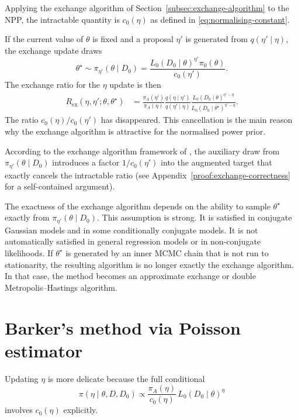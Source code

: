 Applying the exchange algorithm of Section~\ref{subsec:exchange-algorithm} to the NPP, the intractable quantity is $c_0(\eta)$ as defined in \eqref{eq:normalising-constant}.

If the current value of $\theta$ is fixed and a proposal $\eta'$ is generated from $q(\eta' \mid \eta)$, the exchange update draws
\begin{equation}
\theta^\star
\sim
\pi_{\eta'}(\theta \mid D_0)
=
\frac{L_0(D_0 \mid \theta)^{\eta'}\pi_0(\theta)}
{c_0(\eta')}.
\end{equation}
The exchange ratio for the $\eta$ update is then
\begin{align}
R_{\mathrm{ex}}(\eta,\eta';\theta,\theta^\star)
&=
\frac{\pi_A(\eta')}{\pi_A(\eta)}
\frac{q(\eta \mid \eta')}{q(\eta' \mid \eta)}
\frac{L_0(D_0 \mid \theta)^{\eta'-\eta}}
{L_0(D_0 \mid \theta^\star)^{\eta'-\eta}}.
\end{align}
The ratio $c_0(\eta)/c_0(\eta')$ has disappeared.
This cancellation is the main reason why the exchange algorithm is attractive for the normalised power prior.

According to the exchange algorithm framework of , the auxiliary draw from $\pi_{\eta'}(\theta \mid D_0)$ introduces a factor $1/c_0(\eta')$ into the augmented target that exactly cancels the intractable ratio (see Appendix~\ref{proof:exchange-correctness} for a self-contained argument).

The exactness of the exchange algorithm depends on the ability to sample $\theta^\star$ exactly from $\pi_{\eta'}(\theta \mid D_0)$.
This assumption is strong.
It is satisfied in conjugate Gaussian models and in some conditionally conjugate models.
It is not automatically satisfied in general regression models or in non-conjugate likelihoods.
If $\theta^\star$ is generated by an inner MCMC chain that is not run to stationarity, the resulting algorithm is no longer exactly the exchange algorithm.
In that case, the method becomes an approximate exchange or double Metropolis--Hastings algorithm.

\section{Barker's method via Poisson estimator}
\label{sec:barker-poisson}

Updating $\eta$ is more delicate because the full conditional
\begin{equation}
    \pi(\eta \mid \theta, D, D_0) \propto \frac{\pi_A(\eta)}{c_0(\eta)}\, L_0(D_0 \mid \theta)^{\eta}
    \label{eq:eta-full-conditional}
\end{equation}
involves $c_0(\eta)$ explicitly.

